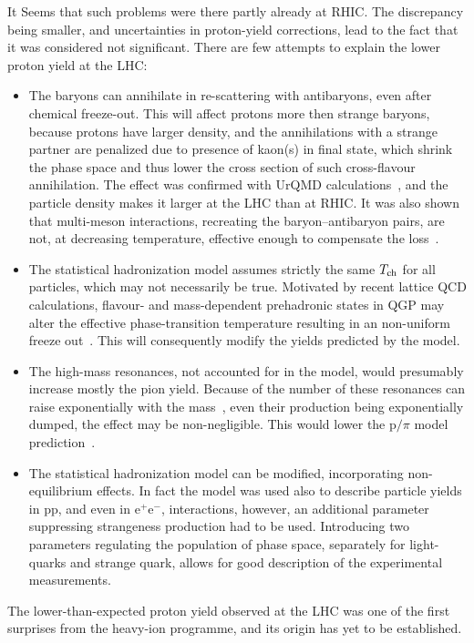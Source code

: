 It Seems that such problems were there partly already at RHIC. The discrepancy being smaller, and uncertainties in proton-yield corrections, lead to the fact that it was considered not significant. There are few attempts to explain the lower proton yield at the LHC:
\begin{itemize}
\item{The baryons can annihilate in re-scattering with antibaryons, even after chemical freeze-out. This will affect protons more then strange baryons, because protons have larger density, and the annihilations with a strange partner are penalized due to presence of kaon(s) in final state, which shrink the phase space and thus lower the cross section of such cross-flavour annihilation. The effect was confirmed with UrQMD calculations~\cite{Karpenko:2012yf,Steinheimer:2012rd,Becattini:2012xb}, and the particle density makes it larger at the LHC than at RHIC. It was also shown that multi-meson interactions, recreating the baryon--antibaryon pairs, are not, at decreasing temperature, effective enough to compensate the loss~\cite{Pan:2012ne}.}
\item{The statistical hadronization model assumes strictly the same $T_{\rm ch}$ for all particles, which may not necessarily be true. Motivated by recent lattice QCD calculations, flavour- and mass-dependent prehadronic states in QGP may alter the effective phase-transition temperature resulting in an non-uniform freeze out~\cite{Ratti:2011au}. This will consequently modify the yields predicted by the model.}
\item{The high-mass resonances, not accounted for in the model, would presumably increase mostly the pion yield. Because of the number of these resonances can raise exponentially with the mass~\cite{Hagedorn:1965st,RHagedorn:1968}, even their production being exponentially dumped, the effect may be non-negligible. This would lower the p$/\pi$ model prediction~\cite{Andronic:2008gu}.}
\item{The statistical hadronization model can be modified, incorporating non-equilibrium effects. In fact the model was used also to describe particle yields in pp, and even in e$^+$e$^-$, interactions, however, an additional parameter suppressing strangeness production had to be used. Introducing two parameters regulating the population of phase space, separately for light-quarks and strange quark, allows for good description of the experimental measurements.~\cite{Rafelski:2010cw,Petran:2013lja}}
\end{itemize}
The lower-than-expected proton yield observed at the LHC was one of the first surprises from the heavy-ion programme, and its origin has yet to be established.

